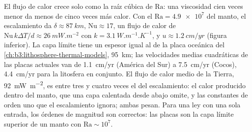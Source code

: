 El flujo de calor crece solo como la raíz cúbica de $\mathrm{Ra}$: una viscosidad
cien veces menor da menos de cinco veces más calor.
Con el $\mathrm{Ra} = \num{4.9e7}$ del manto, el escalamiento da $\delta \approx \qty{87}{km}$,
$\mathrm{Nu} \approx 17$, un flujo de calor de $\mathrm{Nu}\,k\Delta T/d \approx
\qty{26}{mW.m^{-2}}$ con $k = \qty{3.1}{W.m^{-1}.K^{-1}}$, y $u \approx
\qty{1.2}{cm/yr}$ (figura inferior). La capa límite tiene un espesor igual al de la
placa oceánica del \cref{ch:b3:lithosphere-thermal-models}, \qty{95}{km};
las velocidades medias cuadráticas de las placas actuales van de \qty{1.1}{cm/yr} (América del
Sur) a \qty{7.5}{cm/yr} (Cocos), \qty{4.4}{cm/yr} para la litosfera en
conjunto. El flujo de calor medio de la Tierra, \qty{92}{mW.m^{-2}}, es entre tres y cuatro
veces el del escalamiento: el calor producido dentro del manto, que una capa
calentada desde abajo omite, y las constantes de orden uno que el escalamiento
ignora; ambas pesan. Para una ley con una sola entrada, los órdenes de magnitud
son correctos: las placas son la capa límite superior de un manto con $\mathrm{Ra}
\sim 10^7$.

